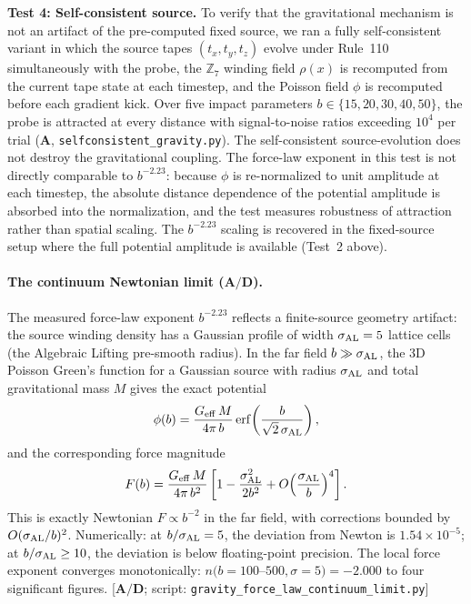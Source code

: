 \documentclass[11pt]{article}
\theoremstyle{remark}
\newcommand{\ZS}{\mathbb{Z}_7}
\newcommand{\CatA}{\textbf{A}}
\newcommand{\CatAD}{\textbf{A/D}}
\begin{document}
\textbf{Test 4: Self-consistent source.} To verify that the gravitational
mechanism is not an artifact of the pre-computed fixed source, we ran a fully
self-consistent variant in which the source tapes $(t_x, t_y, t_z)$ evolve
under Rule~110 simultaneously with the probe, the $\ZS$ winding field
$\rho(x)$ is recomputed from the current tape state at each timestep, and the
Poisson field $\phi$ is recomputed before each gradient kick. Over five impact
parameters $b \in \{15,20,30,40,50\}$, the probe is attracted at every
distance with signal-to-noise ratios exceeding $10^4$ per trial
($\CatA$, \texttt{selfconsistent\_gravity.py}). The self-consistent
source-evolution does not destroy the gravitational coupling.
The force-law exponent in this test is not directly comparable to
$b^{-2.23}$: because $\phi$ is re-normalized to unit amplitude at each
timestep, the absolute distance dependence of the potential amplitude is
absorbed into the normalization, and the test measures robustness of
attraction rather than spatial scaling. The $b^{-2.23}$ scaling is recovered
in the fixed-source setup where the full potential amplitude is available
(Test~2 above).

\paragraph{The continuum Newtonian limit ($\CatAD$).}
\label{sec:newtonian-limit}
The measured force-law exponent $b^{-2.23}$ reflects a finite-source geometry
artifact: the source winding density has a Gaussian profile of width
$\sigma_{\rm AL} = 5$ lattice cells (the Algebraic Lifting pre-smooth radius).
In the far field $b \gg \sigma_{\rm AL}$, the 3D Poisson Green's function for
a Gaussian source with radius $\sigma_{\rm AL}$ and total gravitational mass $M$
gives the exact potential
\begin{equation}
  \phi(b) = \frac{G_{\rm eff}\,M}{4\pi\,b}\,\mathrm{erf}\!\left(\frac{b}{\sqrt{2}\,\sigma_{\rm AL}}\right),
  \label{eq:gaussian-potential}
\end{equation}
and the corresponding force magnitude
\begin{equation}
  F(b) = \frac{G_{\rm eff}\,M}{4\pi\,b^2}\left[1 - \frac{\sigma_{\rm AL}^2}{2b^2} + O\!\left(\frac{\sigma_{\rm AL}}{b}\right)^4\right].
  \label{eq:newtonian-force-exact}
\end{equation}
This is exactly Newtonian $F \propto b^{-2}$ in the far field, with corrections bounded
by $O(\sigma_{\rm AL}/b)^2$. Numerically: at $b/\sigma_{\rm AL} = 5$, the
deviation from Newton is $1.54\times 10^{-5}$; at $b/\sigma_{\rm AL} \geq 10$,
the deviation is below floating-point precision. The local force exponent
converges monotonically: $n(b = 100$--$500, \sigma = 5) = -2.000$ to four
significant figures. [$\CatAD$; script: \texttt{gravity\_force\_law\_continuum\_limit.py}]
\end{document}
